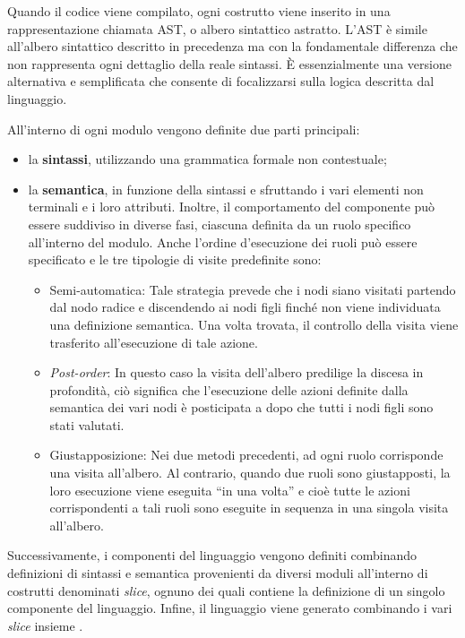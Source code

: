 \documentclass[12pt,a4paper,openright,twoside]{book}
\begin{document}
Quando il codice viene compilato, ogni costrutto viene inserito in una rappresentazione chiamata \ac{AST}, o albero sintattico astratto. 
L'\ac{AST} è simile all'albero sintattico descritto in precedenza ma con la fondamentale differenza che non rappresenta ogni dettaglio della 
reale sintassi. È essenzialmente una versione alternativa e semplificata che consente di focalizzarsi sulla logica descritta dal linguaggio.

All’interno di ogni modulo vengono definite due parti principali:
\begin{itemize}
    \item la \textbf{sintassi}, utilizzando una grammatica formale non contestuale;
    \item la \textbf{semantica}, in funzione della sintassi e sfruttando i vari elementi non terminali e i loro attributi. Inoltre, il 
    comportamento del componente può essere suddiviso in diverse fasi, ciascuna definita da un ruolo specifico all'interno del modulo. Anche 
    l'ordine d'esecuzione dei ruoli può essere specificato e le tre tipologie di visite predefinite sono:
    \begin{itemize}
        \item Semi-automatica: Tale strategia prevede che i nodi siano visitati partendo dal nodo radice e discendendo ai nodi figli finché non 
        viene individuata una definizione semantica. Una volta trovata, il controllo della visita viene trasferito all'esecuzione di tale azione.
        \item \textit{Post-order}: In questo caso la visita dell'albero predilige la discesa in profondità, ciò significa che l'esecuzione delle 
        azioni definite dalla semantica dei vari nodi è posticipata a dopo che tutti i nodi figli sono stati valutati.
        \item Giustapposizione: Nei due metodi precedenti, ad ogni ruolo corrisponde una visita all'albero. Al contrario, quando due ruoli sono 
        giustapposti, la loro esecuzione viene eseguita ``in una volta'' e cioè tutte le azioni corrispondenti a tali ruoli sono eseguite in 
        sequenza in una singola visita all'albero.
    \end{itemize}
\end{itemize}

Successivamente, i componenti del linguaggio vengono definiti combinando definizioni di sintassi e semantica provenienti da diversi moduli 
all’interno di costrutti denominati \textit{slice}, ognuno dei quali contiene la definizione di un singolo componente del linguaggio. 
Infine, il linguaggio viene generato combinando i vari \textit{slice} insieme \cite{Vacchi2015}.
\end{document}
